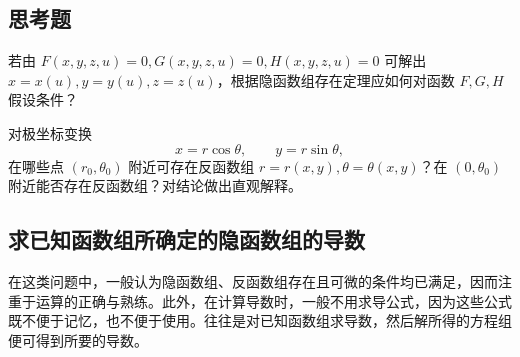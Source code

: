\subsection{思考题}

\begin{xthought}[1]
若由 $F(x,y,z,u)=0,G(x,y,z,u)=0,H(x,y,z,u)=0$ 可解出 $x=x(u),y=y(u),z=z(u)$，根据隐函数组存在定理应如何对函数 $F,G,H$ 假设条件？
\end{xthought}

\begin{xthought}[2]
对极坐标变换
  \[
    x=r\cos\theta,\qquad y=r\sin\theta,
  \]
  在哪些点 $(r_0,\theta_0)$ 附近可存在反函数组 $r=r(x,y),\theta=\theta(x,y)$？在 $(0,\theta_0)$ 附近能否存在反函数组？对结论做出直观解释。
\end{xthought}

\subsection{求已知函数组所确定的隐函数组的导数}

在这类问题中，一般认为隐函数组、反函数组存在且可微的条件均已满足，因而注重于运算的正确与熟练。此外，在计算导数时，一般不用求导公式，因为这些公式既不便于记忆，也不便于使用。往往是对已知函数组求导数，然后解所得的方程组便可得到所要的导数。

